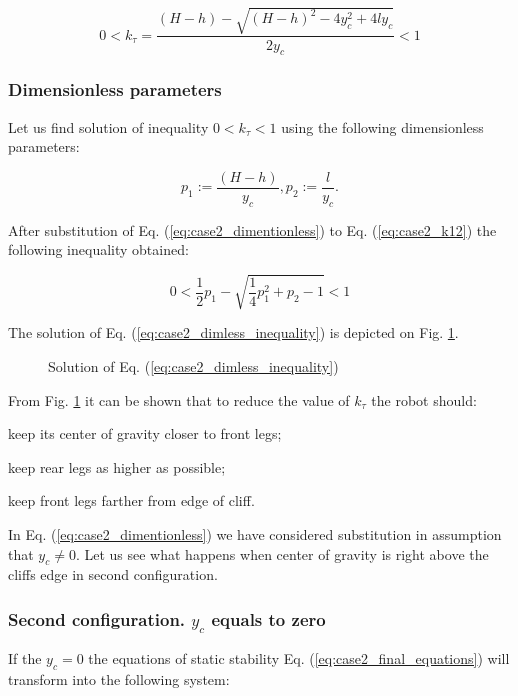 \documentclass{ws-procs9x6}
\begin{document}
\begin{equation}
  \label{eq:case2_k12}
 0 < k_\tau = \dfrac{(H-h) - \sqrt{(H-h)^2 - 4y^2_c + 4ly_c}}{2y_c} < 1
\end{equation}


\subsubsection{Dimensionless parameters}
Let us find solution of inequality $0<k_\tau<1$ using the following dimensionless parameters:

\begin{equation}
\label{eq:case2_dimentionless}
  p_1 := \dfrac{(H-h)}{y_c}, p_2 := \dfrac{l}{y_c}.
\end{equation}

After substitution of Eq. (\ref{eq:case2_dimentionless}) to Eq. (\ref{eq:case2_k12}) the following inequality obtained:

\begin{equation}
\label{eq:case2_dimless_inequality}
0< \dfrac{1}{2} p_1 - \sqrt{\dfrac{1}{4} p_1^2+p_2-1}<1
\end{equation}

The solution of Eq. (\ref{eq:case2_dimless_inequality}) is depicted on Fig. \ref{aba:case2_dimless_figure}.


\begin{figure}
  \begin{center}
  \end{center}
  \caption{Solution of Eq. (\ref{eq:case2_dimless_inequality})}
  \label{aba:case2_dimless_figure}
\end{figure}

From Fig. \ref{aba:case2_dimless_figure} it can be shown that to reduce the value of $k_\tau$ the robot should:
\begin{itemlist}
\item keep its center of gravity closer to front legs;
\item keep rear legs as higher as possible;
\item keep front legs farther from edge of cliff.
\end{itemlist}

In Eq. (\ref{eq:case2_dimentionless}) we have considered substitution in assumption that $y_c\ne0$. Let us see what happens when center of gravity is right above the cliffs edge in second configuration.

\subsubsection{Second configuration. $y_c$ equals to zero}
If the $y_c = 0$ the equations of static stability Eq. (\ref{eq:case2_final_equations}) will transform into the following system:
\end{document}
